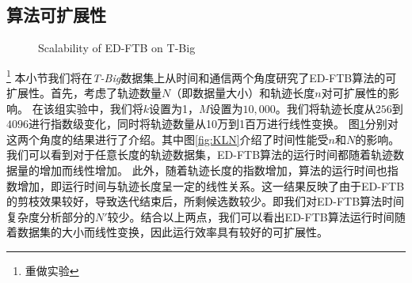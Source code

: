 \subsection{算法可扩展性}
\begin{figure} [!b]
	\centering
	\caption{Scalability of ED-FTB on {T-Big}}
	\label{fig:EDScalability}
\end{figure}
\footnote{重做实验}
 本小节我们将在\emph{T-Big}数据集上从时间和通信两个角度研究了ED-FTB算法的可扩展性。首先，考虑了轨迹数量$N$（即数据量大小）和轨迹长度$n$对可扩展性的影响。
在该组实验中，我们将$k$设置为1，$M$设置为$10,000$。我们将轨迹长度从$256$到$4096$进行指数级变化，同时将轨迹数量从10万到1百万进行线性变换。
  图\ref{fig:EDScalability}分别对这两个角度的结果进行了介绍。其中图\ref{fig:KLN}介绍了时间性能受$n$和$N$的影响。我们可以看到对于任意长度的轨迹数据集，ED-FTB算法的运行时间都随着轨迹数据量的增加而线性增加。
  此外，随着轨迹长度的指数增加，算法的运行时间也指数增加，即运行时间与轨迹长度呈一定的线性关系。这一结果反映了由于ED-FTB的剪枝效果较好，导致迭代结束后，所剩候选数较少。即我们对ED-FTB算法时间复杂度分析部分的$N'$较少。结合以上两点，我们可以看出ED-FTB算法运行时间随着数据集的大小而线性变换，因此运行效率具有较好的可扩展性。
%



